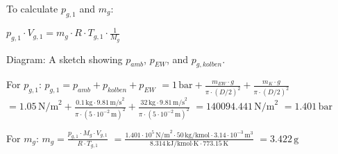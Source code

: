 To calculate \( p_{g,1} \) and \( m_g \):  

\( p_{g,1} \cdot V_{g,1} = m_g \cdot R \cdot T_{g,1} \cdot \frac{1}{M_g} \)  

Diagram: A sketch showing \( p_{amb} \), \( p_{EW} \), and \( p_{g,kolben} \).  

For \( p_{g,1} \):  
\( p_{g,1} = p_{amb} + p_{kolben} + p_{EW} \)  
\( = 1 \, \text{bar} + \frac{m_{EW} \cdot g}{\pi \cdot (D/2)^2} + \frac{m_K \cdot g}{\pi \cdot (D/2)^2} \)  
\( = 1.05 \, \text{N/m}^2 + \frac{0.1 \, \text{kg} \cdot 9.81 \, \text{m/s}^2}{\pi \cdot (5 \cdot 10^{-2} \, \text{m})^2} + \frac{32 \, \text{kg} \cdot 9.81 \, \text{m/s}^2}{\pi \cdot (5 \cdot 10^{-2} \, \text{m})^2} \)  
\( = 140094.441 \, \text{N/m}^2 \)  
\( = 1.401 \, \text{bar} \)  

For \( m_g \):  
\( m_g = \frac{p_{g,1} \cdot M_g \cdot V_{g,1}}{R \cdot T_{g,1}} \)  
\( = \frac{1.401 \cdot 10^5 \, \text{N/m}^2 \cdot 50 \, \text{kg/kmol} \cdot 3.14 \cdot 10^{-3} \, \text{m}^3}{8.314 \, \text{kJ/kmol·K} \cdot 773.15 \, \text{K}} \)  
\( = 3.422 \, \text{g} \)